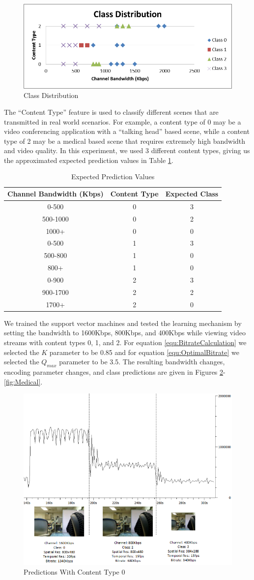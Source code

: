 \documentclass[a4paper,12pt]{article}
\begin{document}
\begin{figure}[h]
\centering
\includegraphics[width=0.5\linewidth]{ClassDistribution.png}
\caption{Class Distribution}
\label{fig:ClassDistribution}
\end{figure}
The ``Content Type'' feature is used to classify different scenes that are transmitted in real world scenarios. For example, a content type of 0 may be a video conferencing application with a ``talking head'' based scene, while a content type of 2 may be a medical based scene that requires extremely high bandwidth and video quality. In this experiment, we used 3 different content types, giving us the approximated expected prediction values in Table \ref{tab:ExpectedValues}.
\begin{table}
\caption{Expected Prediction Values}
\label{tab:ExpectedValues}
\begin{tabular}{c|c|c}
\textbf{Channel Bandwidth (Kbps)}&\textbf{Content Type}&\textbf{Expected Class}\\
\hline
0-500&0&3\\
500-1000&0&2\\
1000+&0&0\\
0-500&1&3\\
500-800&1&0\\
800+&1&0\\
0-900&2&3\\
900-1700&2&2\\
1700+&2&0
\end{tabular}
\end{table}
We trained the support vector machines and tested the learning mechanism by setting the bandwidth to 1600Kbps, 800Kbps, and 400Kbps while viewing video streams with content types 0, 1, and 2. For equation \ref{equ:BitrateCalculation} we selected the $K$ parameter to be 0.85 and for equation \ref{equ:OptimalBitrate} we selected the $Q_{max}$ parameter to be 3.5. The resulting bandwidth changes, encoding parameter changes, and class predictions are given in Figures \ref{fig:TalkingHead}-\ref{fig:Medical}.
\begin{figure}[h]
\centering
\includegraphics[width=0.5\linewidth]{TrainingExperimentTalkingHead.png}
\caption{Predictions With Content Type 0}
\label{fig:TalkingHead}
\end{figure}
\end{document}

